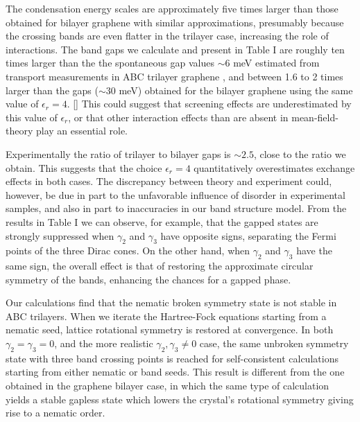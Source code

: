 \documentclass[twocolumn,prb,showpacs,preprintnumbers,amsmath,amssymb]{revtex4}
\begin{document}
%
The condensation energy scales are approximately five times 
larger than those obtained for bilayer graphene\cite{jeilbilayer}
with similar approximations, presumably because the crossing bands are 
even flatter in the trilayer case, increasing the role of interactions.     
The band gaps we calculate and present in Table I are roughly ten times larger than the 
the spontaneous gap values $\sim 6$ meV estimated from transport 
measurements in ABC trilayer graphene \cite{trilayers1}, 
and between 1.6 to 2 times larger than the gaps ($\sim 30$ meV) obtained for the bilayer graphene
using the same value of $\epsilon_r = 4$. []
This could suggest that screening effects are underestimated by this value of 
$\epsilon_r$, or that other interaction effects than are absent in 
mean-field-theory play an essential role.  

Experimentally the ratio of trilayer to bilayer gaps is $\sim 2.5$,
close to the ratio we obtain.   
This suggests that the choice $\epsilon_r=4$ quantitatively
overestimates exchange effects in both cases. 
The discrepancy between theory and experiment could, however, be 
due in part to the unfavorable influence of disorder in experimental
 samples, and also in part to inaccuracies in our band structure model.  
From the results in Table I we can observe, for example, 
that the gapped states are strongly suppressed
when $\gamma_2$ and $\gamma_3$ have opposite signs, separating 
the Fermi points of the three Dirac cones. 
On the other hand, when $\gamma_2$ and $\gamma_3$ have the same
sign, \cite{tightbindingtrilayer}
the overall effect is that of restoring the approximate circular symmetry of the bands,
enhancing the chances for a gapped phase. 


Our calculations find that the nematic broken symmetry state is not stable in ABC trilayers.
When we iterate the Hartree-Fock equations starting from a nematic seed, 
lattice rotational symmetry is restored at convergence.  
In both $\gamma_2=\gamma_3=0$,
and the more realistic $\gamma_2,\gamma_3 \ne 0$ case, the 
same unbroken symmetry state with three band crossing points
is reached for self-consistent 
calculations starting from either nematic or band seeds.   
This result is different from the one obtained in the graphene bilayer case, in which the same type of calculation 
yields a stable gapless state which lowers the crystal's rotational symmetry giving rise to a 
nematic order. \cite{inprep}
\end{document}
